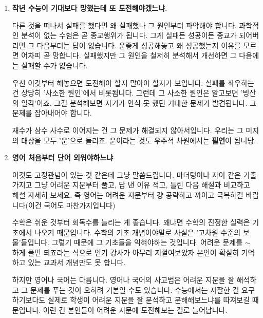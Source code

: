 \vspace{5mm}
\begin{enumerate}
    \item \textbf{작년 수능이 기대보다 망했는데 또 도전해야겠느냐.}
    \vspace{5mm}

    다른 것을 떠나서 실패를 했다면 왜 실패했나 그 원인부터 파악해야 합니다.
    과학적인 분석이 없는 수험은 곧 종교행위가 됩니다. 그게 실패든 성공이든 종교가 되어버리면 그 다음부터는 답이 없습니다.
    운좋게 성공해놓고 왜 성공했는지 이유를 모르면 어차피 곧 망합니다.
    실패했지만 그 원인을 철저히 분석해서 개선하면 그 다음에는 실패할 수가 없습니다.
    \vspace{5mm}

    우선 이것부터 해놓으면 도전해야 할지 말아야 할지가 보입니다.
    실패를 좌우하는 건 상당히 '사소한 원인'에서 비롯됩니다.
    그런데 그 사소한 원인은 알고보면 '빙산의 일각'이죠. 그걸 분석해보면 자기가 인식 못 했던 거대한 문제가 발견됩니다.
    그 문제를 잡아내어야 합니다.
    \vspace{5mm}

    재수가 삼수 사수로 이어지는 건 그 문제가 해결되지 않아서입니다. 우리는 그 미지의 대상을 모두 '운'으로 돌리죠.
    운이라는 것도 우주적 차원에서는 \textbf{필연}이 됩니당.
    \vspace{5mm}

    \item \textbf{영어 처음부터 단어 외워야하느냐}
    \vspace{5mm}

    이것도 고정관념이 있는 것 같은데 그냥 말씀드립니다.
    마더텅이나 자이 같은 기출 가지고 그냥 어려운 지문부터 풀고, 답 낸 이유 적고, 틀린 다음 해설과 비교하고 해설 자세히 보세요.
    즉 영어는 어려운 지문부터 걍 공략하고 까이고 극복하길 바랍니다(이건 국어도 마찬가지입니다)
    \vspace{5mm}

    수학은 쉬운 것부터 회독수를 늘리는 게 좋습니다. 왜냐면 수학의 진정한 실력은 기초에서 나오기 때문입니다.
    수학의 기초 개념이야말로 사실은 '고차원 수준의 보물'들입니다. 그렇기 때문에 그 기초들을 익혀야하는 것입니다.
    어려운 문제를 $\sim$ 하게 풀면 되죠라는 식으로 인기 강사가 아무리 지껄여보았자 본인이 확실히 기억하고 있는 교과서 개념만도 못 합니다.
    \vspace{5mm}

    하지만 영어나 국어는 다릅니다. 영어나 국어의 사고법은 어려운 지문을 잘 해석하고 그 문제를 푸는 것이 오히려 기본일 수도 있습니다.
    수능에서는 자잘한 걸 요구하기보다도 실제로 학생이 어려운 지문을 잘 분석하고 분해해보느냐를 따져보길 때문입니다.
    이런 건 본인들이 어려운 지문에 도전해보는 걸로 늘어납니다.
    \vspace{5mm}


\end{enumerate}
